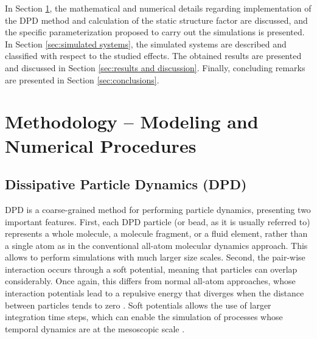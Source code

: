 \documentclass[
journal=mamobx,
manuscript=article,
]{achemso}
\begin{document}
In Section \ref{sec:methodology}, the mathematical and numerical details regarding implementation of the DPD method and calculation of the static structure factor are discussed, and the specific parameterization proposed to carry out the simulations is presented.
In Section \ref{sec:simulated systems}, the simulated systems are described and classified with respect to the studied effects.
The obtained results are presented and discussed in Section \ref{sec:results and discussion}.
Finally, concluding remarks are presented in Section \ref{sec:conclusions}.

\section{Methodology – Modeling and Numerical Procedures}
\label{sec:methodology}

\subsection{Dissipative Particle Dynamics (DPD)}
\label{sec:dpd}

DPD \cite{Hoogerbrugge_1992} is a coarse-grained method for performing particle dynamics, presenting two important features.
First, each DPD particle (or bead, as it is usually referred to) represents a whole molecule, a molecule fragment, or a fluid element, rather than a single atom as in the conventional all-atom molecular dynamics approach.
This allows to perform simulations with much larger size scales.
Second, the pair-wise interaction occurs through a soft potential, meaning that particles can overlap considerably.
Once again, this differs from normal all-atom approaches, whose interaction potentials lead to a repulsive energy that diverges when the distance between particles tends to zero \cite{Frenkel_2002}.
Soft potentials allows the use of larger integration time steps, which can enable the simulation of processes whose temporal dynamics are at the mesoscopic scale \cite{Hoogerbrugge_1992, Espanol_1995}.
\end{document}
